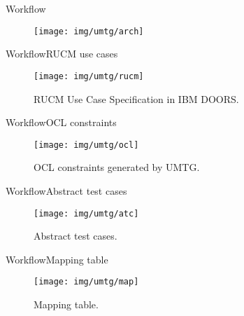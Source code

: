 \documentclass[10pt]{beamer}
\newcommand{\1}{
        	\setbeamertemplate{background}{
        		\texttt{[image: img/1]}
        		\tikz[overlay] \fill[fill opacity=0.75,fill=white] (0,0) rectangle (-\paperwidth,\paperheight);
        	}
}
\begin{document}
\begin{frame}{Workflow}{}	
	\begin{figure}
		\centering
		\texttt{[image: img/umtg/arch]}
	\end{figure}	
\end{frame}


\begin{frame}{Workflow}{RUCM use cases}	
	\begin{figure}
		\centering
		\texttt{[image: img/umtg/rucm]}
		\caption{RUCM Use Case Specification in IBM DOORS.}
	\end{figure}	
\end{frame}

\begin{frame}{Workflow}{OCL constraints}	
	\begin{figure}
		\centering
		\texttt{[image: img/umtg/ocl]}
		\caption{OCL constraints generated by UMTG.}
	\end{figure}	
\end{frame}

\begin{frame}{Workflow}{Abstract test cases}	
	\begin{figure}
		\centering
		\texttt{[image: img/umtg/atc]}
		\caption{Abstract test cases.}
	\end{figure}	
\end{frame}

\begin{frame}{Workflow}{Mapping table}	
	\begin{figure}
		\centering
		\texttt{[image: img/umtg/map]}
		\caption{Mapping table.}
	\end{figure}	
\end{frame}
\end{document}
